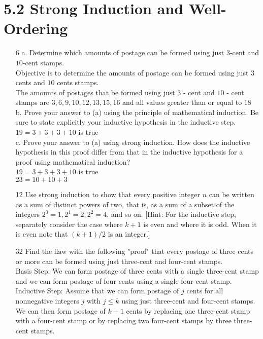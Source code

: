 \documentclass[a4paper]{article}
\newcommand\tab[1][0.5cm]{\hspace*{#1}}
\begin{document}
  \section*{5.2 Strong Induction and Well-Ordering}
  \begin{itemize}
    \item[6] 
      a. Determine which amounts of postage can be formed using just $3$-cent and $10$-cent stamps. \\
      \tab Objective is to determine the amounts of postage can be formed using just $3$ cents and $10$ cents stamps. \\
      \tab The amounts of postages that be formed using just $3$ - cent and $10$ - cent stamps are $3, 6, 9, 10, 12, 13, 15, 16$ and all values greater than or equal to $18$ \\
      b. Prove your answer to (a) using the principle of mathematical induction. Be sure to state explicitly your inductive hypothesis in the inductive step. \\
      \tab $19 = 3 + 3 + 3 + 10$ is true \\
      c. Prove your answer to (a) using strong induction. How does the inductive hypothesis in this proof differ from that in the inductive hypothesis for a proof using mathematical induction? \\
      \tab $19 = 3 + 3 + 3 + 10$ is true \\
      \tab $23 = 10 + 10 + 3$
    \item[12] Use strong induction to show that every positive integer $n$ can be written as a sum of distinct powers of two, that is, as a sum of a subset of the integers $2^{0} = 1, 2^{1} = 2, 2^{2} = 4$, and so on. [Hint: For the inductive step, separately consider the case where $k + 1$ is even and where it is odd. When it is even note that $(k + 1)/2$ is an integer.] \\
    \tab  
    \item[32] Find the flaw with the following "proof" that every postage of three cents or more can be formed using just three-cent and four-cent stamps. \\
    \tab Basis Step: We can form postage of three cents with a single three-cent stamp and we can form postage of four cents using a single four-cent stamp. \\
    \tab Inductive Step: Assume that we can form postage of $j$ cents for all nonnegative integers $j$ with $j \leq k$ using just three-cent and four-cent stamps. We can then form postage of $k + 1$ cents by replacing one three-cent stamp with a four-cent stamp or by replacing two four-cent stamps by three three-cent stamps.
  \end{itemize}
\end{document}
